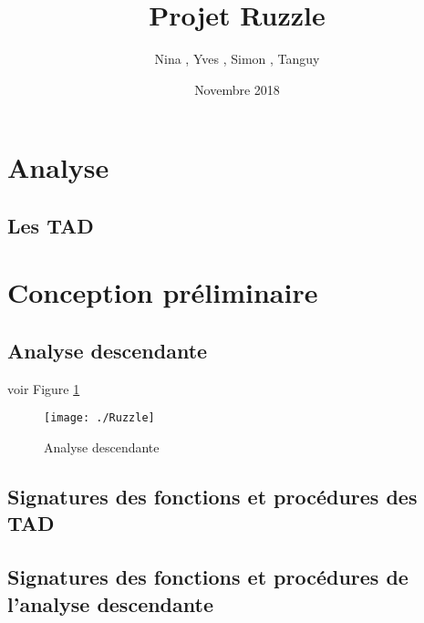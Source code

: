\documentclass[a4paper]{article}
\title{Projet Ruzzle}
\author{Nina \noun{Lardiere}, Yves \noun{Le Guennec}, Simon \noun{Lebeaud}, Tanguy \noun{Leclerc}}
\date{Novembre 2018}
\begin{document}
	\maketitle
	\section{Analyse}
		\subsection{Les TAD}
		

 \section{Conception préliminaire}
		\subsection{Analyse descendante}
			voir Figure \ref{fig:AD}
			\begin{figure}
				\centering \texttt{[image: ./Ruzzle]} %
				\caption{\label{fig:AD}Analyse descendante}
			\end{figure}

		\subsection{Signatures des fonctions et procédures des TAD}
		
		
		
		
	\subsection{Signatures des fonctions et procédures de l'analyse descendante}
\end{document}
